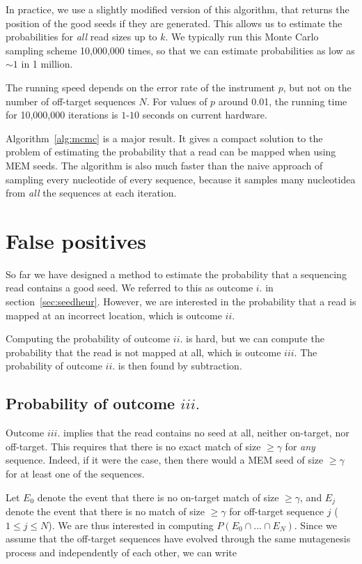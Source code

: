 \documentclass{article}
\begin{document}
In practice, we use a slightly modified version of this algorithm, that
returns the position of the good seeds if they are generated. This allows
us to estimate the probabilities for \emph{all} read sizes up to $k$. We
typically run this Monte Carlo sampling scheme 10,000,000 times, so that
we can estimate probabilities as low as $\sim1$ in 1 million.

The running speed depends on the error rate of the instrument $p$, but not
on the number of off-target sequences $N$. For values of $p$ around 0.01,
the running time for 10,000,000 iterations is $1$-$10$ seconds on current
hardware.

Algorithm~\ref{alg:mcmc} is a major result. It gives a compact solution to
the problem of estimating the probability that a read can be mapped when
using MEM seeds. The algorithm is also much faster than the naive approach
of sampling every nucleotide of every sequence, because it samples many
nucleotidea from \emph{all} the sequences at each iteration.

\section{False positives}

So far we have designed a method to estimate the probability that a
sequencing read contains a good seed. We referred to this as outcome $i.$
in section~\ref{sec:seedheur}. However, we are interested in the
probability that a read is mapped at an incorrect location, which is
outcome $ii.$

Computing the probability of outcome $ii.$ is hard, but we can compute the
probability that the read is not mapped at all, which is outcome $iii.$
The probability of outcome $ii.$ is then found by subtraction.

\subsection{Probability of outcome $iii.$}

Outcome $iii.$ implies that the read contains no seed at all, neither
on-target, nor off-target. This requires that there is no exact match of
size $\geq \gamma$ for \emph{any} sequence. Indeed, if it were the case,
then there would a MEM seed of size $\geq \gamma$ for at least one of the
sequences.

Let $E_0$ denote the event that there is no on-target match of size $\geq
\gamma$, and $E_j$ denote the event that there is no match of size $\geq
\gamma$ for off-target sequence $j$ ($1 \leq j \leq N$). We are thus
interested in computing $P(E_0 \cap \ldots \cap E_N)$. Since we assume
that the off-target sequences have evolved through the same mutagenesis
process and independently of each other, we can write
\end{document}

